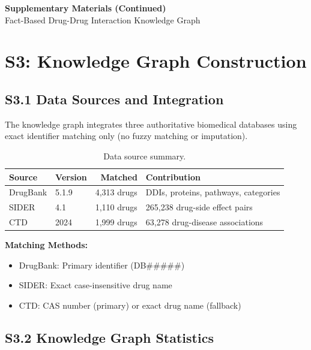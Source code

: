 \documentclass[11pt,a4paper]{article}
\begin{document}
\begin{center}
\Large\textbf{Supplementary Materials (Continued)}\\[0.5em]
\normalsize Fact-Based Drug-Drug Interaction Knowledge Graph
\end{center}

\section{S3: Knowledge Graph Construction}

\subsection{S3.1 Data Sources and Integration}

The knowledge graph integrates three authoritative biomedical databases using exact identifier matching only (no fuzzy matching or imputation).

\begin{table}[H]
\centering
\caption{Data source summary.}
\label{tab:sources}
\begin{tabular}{@{}llrl@{}}
\toprule
\textbf{Source} & \textbf{Version} & \textbf{Matched} & \textbf{Contribution} \\
\midrule
DrugBank & 5.1.9 & 4,313 drugs & DDIs, proteins, pathways, categories \\
SIDER & 4.1 & 1,110 drugs & 265,238 drug-side effect pairs \\
CTD & 2024 & 1,999 drugs & 63,278 drug-disease associations \\
\bottomrule
\end{tabular}
\end{table}

\textbf{Matching Methods:}
\begin{itemize}
    \item DrugBank: Primary identifier (DB\#\#\#\#\#)
    \item SIDER: Exact case-insensitive drug name
    \item CTD: CAS number (primary) or exact drug name (fallback)
\end{itemize}

\subsection{S3.2 Knowledge Graph Statistics}
\end{document}

